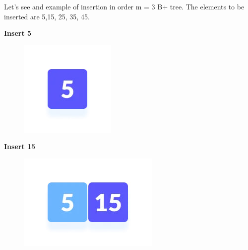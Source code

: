 \documentclass{article}
\begin{document}
        \vspace{12pt}
        Let's see and example of insertion in order m = 3 B+ tree. The elements to be inserted are 5,15, 25, 35, 45.
        \vspace{12pt}
        \begin{center}
              \color{red}\textbf{Insert 5}   
        \end{center}
        \begin{figure}[ht]
            \centering
            \includegraphics[scale=0.8]{Images/bi1.jpg}
        \end{figure}
        \pagebreak
        \begin{center}
              \color{red}\textbf{Insert 15}   
        \end{center}
        \begin{figure}[ht]
            \centering
            \includegraphics[scale=0.8]{Images/bi2.jpg}
        \end{figure}
\end{document}
